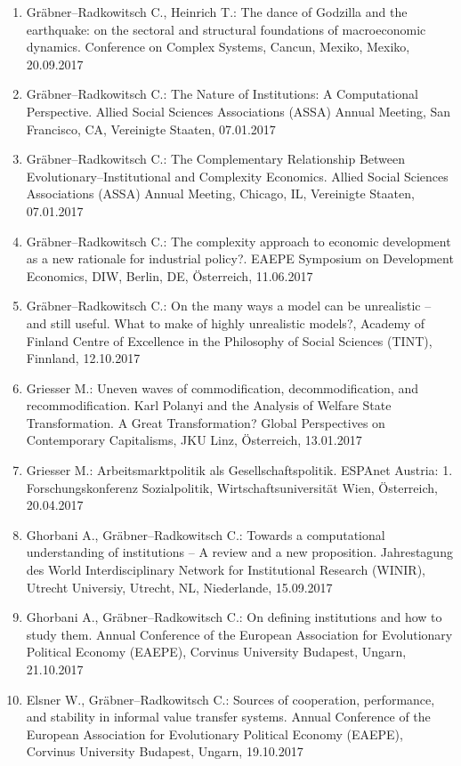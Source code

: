 \begin{enumerate}
	\item Gräbner--Radkowitsch C., Heinrich T.: The dance of Godzilla and the earthquake: on the sectoral and structural foundations of macroeconomic dynamics. Conference on Complex Systems, Cancun, Mexiko, Mexiko, 20.09.2017
	\item Gräbner--Radkowitsch C.: The Nature of Institutions: A Computational Perspective. Allied Social Sciences Associations (ASSA) Annual Meeting, San Francisco, CA, Vereinigte Staaten, 07.01.2017
	\item Gräbner--Radkowitsch C.: The Complementary Relationship Between Evolutionary--Institutional and Complexity Economics. Allied Social Sciences Associations (ASSA) Annual Meeting, Chicago, IL, Vereinigte Staaten, 07.01.2017
	\item Gräbner--Radkowitsch C.: The complexity approach to economic development as a new rationale for industrial policy?. EAEPE Symposium on Development Economics, DIW, Berlin, DE, Österreich, 11.06.2017
	\item Gräbner--Radkowitsch C.: On the many ways a model can be unrealistic – and still useful. What to make of highly unrealistic models?, Academy of Finland Centre of Excellence in the Philosophy of Social Sciences (TINT), Finnland, 12.10.2017
	\item Griesser M.: Uneven waves of commodification, decommodification, and recommodification. Karl Polanyi and the Analysis of Welfare State Transformation. A Great Transformation? Global Perspectives on Contemporary Capitalisms, JKU Linz, Österreich, 13.01.2017
	\item Griesser M.: Arbeitsmarktpolitik als Gesellschaftspolitik. ESPAnet Austria: 1. Forschungskonferenz Sozialpolitik, Wirtschaftsuniversität Wien, Österreich, 20.04.2017
	\item Ghorbani A., Gräbner--Radkowitsch C.: Towards a computational understanding of institutions – A review and a new proposition. Jahrestagung des World Interdisciplinary Network for Institutional Research (WINIR), Utrecht Universiy, Utrecht, NL, Niederlande, 15.09.2017
	\item Ghorbani A., Gräbner--Radkowitsch C.: On defining institutions and how to study them. Annual Conference of the European Association for Evolutionary Political Economy (EAEPE), Corvinus University Budapest, Ungarn, 21.10.2017
	\item Elsner W., Gräbner--Radkowitsch C.: Sources of cooperation, performance, and stability in informal value transfer systems. Annual Conference of the European Association for Evolutionary Political Economy (EAEPE), Corvinus University Budapest, Ungarn, 19.10.2017

\end{enumerate}
